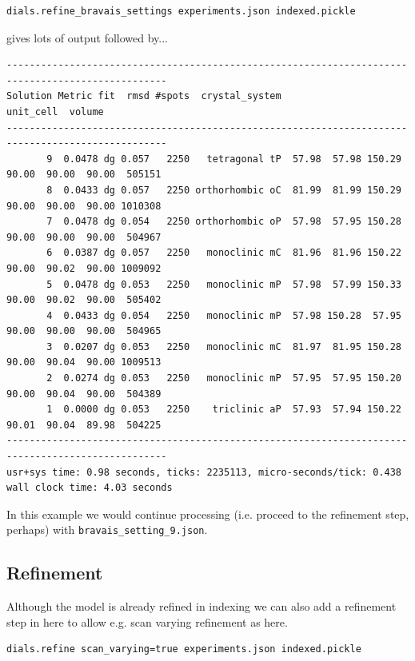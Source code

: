 \documentclass[a4paper, 11pt]{article}
\begin{document}
{\small
\begin{verbatim}
dials.refine_bravais_settings experiments.json indexed.pickle 
\end{verbatim}
}

\noindent
gives lots of output followed by...

{\small
\begin{verbatim}
--------------------------------------------------------------------------------------------------
Solution Metric fit  rmsd #spots  crystal_system                                 unit_cell  volume
--------------------------------------------------------------------------------------------------
       9  0.0478 dg 0.057   2250   tetragonal tP  57.98  57.98 150.29  90.00  90.00  90.00  505151
       8  0.0433 dg 0.057   2250 orthorhombic oC  81.99  81.99 150.29  90.00  90.00  90.00 1010308
       7  0.0478 dg 0.054   2250 orthorhombic oP  57.98  57.95 150.28  90.00  90.00  90.00  504967
       6  0.0387 dg 0.057   2250   monoclinic mC  81.96  81.96 150.22  90.00  90.02  90.00 1009092
       5  0.0478 dg 0.053   2250   monoclinic mP  57.98  57.99 150.33  90.00  90.02  90.00  505402
       4  0.0433 dg 0.054   2250   monoclinic mP  57.98 150.28  57.95  90.00  90.00  90.00  504965
       3  0.0207 dg 0.053   2250   monoclinic mC  81.97  81.95 150.28  90.00  90.04  90.00 1009513
       2  0.0274 dg 0.053   2250   monoclinic mP  57.95  57.95 150.20  90.00  90.04  90.00  504389
       1  0.0000 dg 0.053   2250    triclinic aP  57.93  57.94 150.22  90.01  90.04  89.98  504225
--------------------------------------------------------------------------------------------------
usr+sys time: 0.98 seconds, ticks: 2235113, micro-seconds/tick: 0.438
wall clock time: 4.03 seconds
\end{verbatim}
}

\noindent
In this example we would continue processing (i.e. proceed to the
refinement step, perhaps) with \verb|bravais_setting_9.json|.

\subsection{Refinement}

Although the model is already refined in indexing we can also add a
refinement step in here to allow e.g. scan varying refinement as here.

{\small
\begin{verbatim}
dials.refine scan_varying=true experiments.json indexed.pickle
\end{verbatim}
}
\end{document}
